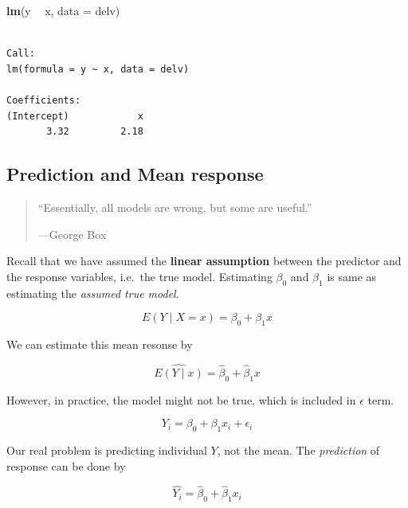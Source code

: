 \documentclass[]{book}
\newenvironment{Shaded}{\begin{snugshade}}{\end{snugshade}}
\newcommand{\DataTypeTok}[1]{\textcolor[rgb]{0.13,0.29,0.53}{#1}}
\newcommand{\KeywordTok}[1]{\textcolor[rgb]{0.13,0.29,0.53}{\textbf{#1}}}
\newcommand{\NormalTok}[1]{#1}
\newcommand{\OperatorTok}[1]{\textcolor[rgb]{0.81,0.36,0.00}{\textbf{#1}}}
\newcommand{\StringTok}[1]{\textcolor[rgb]{0.31,0.60,0.02}{#1}}
\theoremstyle{definition}
\theoremstyle{definition}
\theoremstyle{definition}
\theoremstyle{remark}
\let\BeginKnitrBlock\begin \let\EndKnitrBlock\end
\begin{document}
\begin{Shaded}
\begin{Highlighting}[]
\KeywordTok{lm}\NormalTok{(y }\OperatorTok{~}\StringTok{ }\NormalTok{x, }\DataTypeTok{data =}\NormalTok{ delv)}
\end{Highlighting}
\end{Shaded}

\begin{verbatim}

Call:
lm(formula = y ~ x, data = delv)

Coefficients:
(Intercept)            x  
       3.32         2.18  
\end{verbatim}

\hypertarget{prediction-and-mean-response}{%
\subsection{Prediction and Mean response}\label{prediction-and-mean-response}}

\begin{quote}
``Essentially, all models are wrong, but some are useful.''

---George Box
\end{quote}

Recall that we have assumed the \textbf{linear assumption} between the predictor and the response variables, i.e.~the true model. Estimating \(\beta_0\) and \(\beta_1\) is same as estimating the \emph{assumed true model}.

\BeginKnitrBlock{definition}[Mean response]
\protect\hypertarget{def:eyx}{}{\label{def:eyx} {} }\[E(Y \mid X = x) = \beta_0 + \beta_1 x\]
\EndKnitrBlock{definition}

We can estimate this mean resonse by

\begin{equation}
  \widehat{E(Y \mid x)} = \hat\beta_0 + \hat\beta_1 x
  \label{eq:meanres}
\end{equation}

However, in practice, the model might not be true, which is included in \(\epsilon\) term.

\[Y_i = \beta_0 + \beta_1 x_i + \epsilon_i\]

Our real problem is predicting individual \(Y\), not the mean. The \emph{prediction} of response can be done by

\begin{equation}
  \hat{Y_i}  = \hat\beta_0 + \hat\beta_1 x_i
  \label{eq:indpred}
\end{equation}
\end{document}
